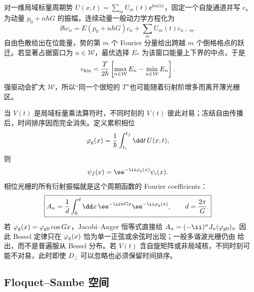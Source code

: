 对一维局域标量周期势
$U(x,t)=\sum_mU_m(t)\ee^{\ii mGx}$，固定一个自旋通道并写 $c_n$ 为动量 $p_0+n\hbar G$ 的振幅，连续动量一般动力学方程化为
\begin{equation}
\boxed{
\ii\hbar\dot c_n
=E(p_0+n\hbar G)c_n+\sum_mU_m(t)c_{n-m}.}
\label{eq:general_periodic_momentum_lattice}
\end{equation}
自由色散给出在位能量，势的第 $m$ 个 Fourier 分量给出跨越 $m$ 个倒格格点的跃迁。若显著占据窗口为 $n\in\mathcal W$，最优选择 $E_*$ 为该窗口能量上下界的中点，于是
\[
\epsilon_{\rm kin}
=\frac{T}{2\hbar}
\left[\max_{n\in\mathcal W}E_n-\min_{n\in\mathcal W}E_n\right].
\]
强驱动会扩大 $\mathcal W$，所以“同一个很短的 $T$”也可能随着衍射阶增多而离开薄光栅区。

当 $V(t)$ 是局域标量乘法算符时，不同时刻的 $V(t)$ 彼此对易；冻结自由传播后，时间排序因而完全消失。定义累积相位
\[
\varphi_{\rm g}(x)=\frac1\hbar\int_{t_i}^{t_f}\dd t\,U(x,t),
\]
则
\[
\psi_f(x)=\ee^{-\ii\varphi_{\rm g}(x)}\psi_i(x).
\]
相位光栅的所有衍射振幅就是这个周期函数的 Fourier coefficients：
\begin{equation}
\boxed{
A_n=\frac1d\int_0^d\dd x\,
\ee^{-\ii nGx}\ee^{-\ii\varphi_{\rm g}(x)},
\qquad d=\frac{2\pi}{G}.}
\label{eq:general_phase_grating_fourier_coefficients}
\end{equation}
若 $\varphi_{\rm g}(x)=\varphi_{\rm g0}\cos Gx$，Jacobi--Anger 恒等式直接给 $A_n=(-\ii)^nJ_n(\varphi_{\rm g0})$。因此 Bessel 定律只在 $\varphi_{\rm g}(x)$ 恰为单一正弦或余弦时出现；一般多谐波光栅仍由 给出，而不是普遍服从 Bessel 分布。若 $V(t)$ 含自旋矩阵或非局域核，不同时刻可能不对易，此时即使 $D_\perp$ 可以忽略也必须保留时间排序。

\subsection{Floquet--Sambe 空间}


